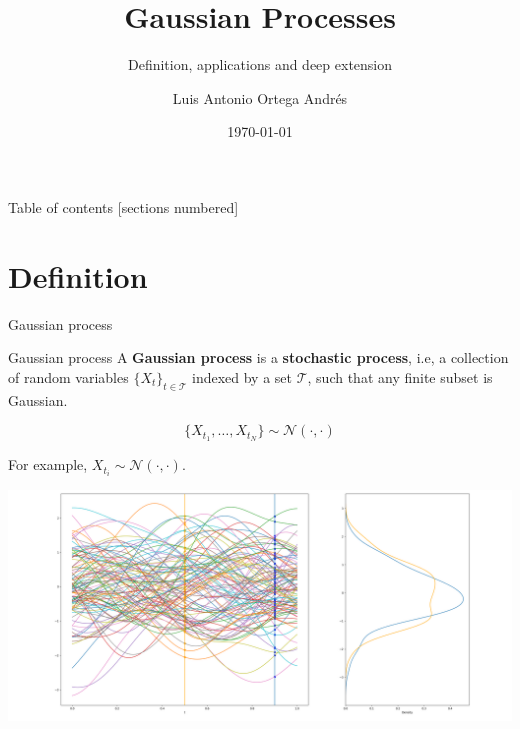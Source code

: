\documentclass[10pt]{beamer}
\title{Gaussian Processes}
\subtitle{Definition, applications and deep extension}
\date{\today}
\author{Luis Antonio Ortega Andrés}
\begin{document}
\maketitle

\begin{frame}{Table of contents}
  [sections numbered]
  \tableofcontents%
\end{frame}

\section[Definitions]{Definition}

\begin{frame}[fragile]{Gaussian process}

    \begin{alertblock}{Gaussian process}
        A \textbf{Gaussian process} is a \textbf{stochastic process}, i.e, a collection of random variables \( \{X_t\}_{t\in \mathcal{T}} \) indexed by a set $\mathcal{T}$, such that any finite subset is Gaussian.
        
        \[
             \{X_{t_1}, \dots, X_{t_N}\} \sim \mathcal{N}\left(\cdot, \cdot\right)
        \]
    \end{alertblock}
\end{frame}

\begin{frame}
    \centering
    For example, \( X_{t_i} \sim \mathcal{N}( \cdot, \cdot) \). 

    \centering    
    \includegraphics[scale = 0.17]{imgs/GP_intro.png}

\end{frame}
\end{document}
